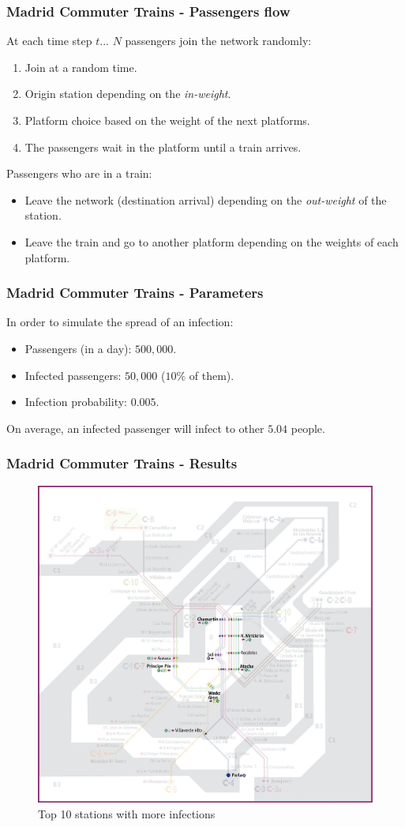 \documentclass{beamer}
\begin{document}
\begin{frame}
\frametitle{Madrid Commuter Trains - Passengers flow}
At each time step $t$...\linebreak
\linebreak
$N$ passengers join the network randomly:
\begin{enumerate}
	\item Join at a random time.
	\item Origin station depending on the \textit{in-weight}.
	\item Platform choice based on the weight of the next platforms.
	\item The passengers wait in the platform until a train arrives.
\end{enumerate}
Passengers who are in a train:
\begin{itemize}
\item Leave the network (destination arrival) depending on the \textit{out-weight} of the station.
\item Leave the train and go to another platform depending on the weights of each platform.
\end{itemize}
\end{frame}
\begin{frame}
\frametitle{Madrid Commuter Trains - Parameters}
In order to simulate the spread of an infection:
\begin{itemize}
	\item Passengers (in a day): $500,000$.
	\item Infected passengers: $50,000$ ($10\%$ of them).
	\item Infection probability: $0.005$.
\end{itemize}
On average, an infected passenger will infect to other $5.04$ people.
\end{frame}
\begin{frame}
\frametitle{Madrid Commuter Trains - Results}
\begin{figure}
	\centering
	\includegraphics[width=.5\linewidth]{Scratch_Visuals/madrid-cercanias-map-top10.png}
	\caption{Top 10 stations with more infections}
\end{figure}
\end{frame}
\end{document}
